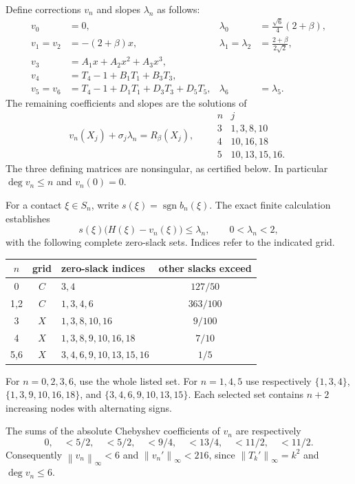 \documentclass[11pt]{article}
\newcommand{\norm}[1]{\left\lVert #1\right\rVert_\infty}
\begin{document}
Define corrections $v_n$ and slopes $\lambda_n$ as follows:
\begin{align*}
 v_0&=0,&\lambda_0&=\tfrac{\sqrt6}{4}(2+\beta),\\
 v_1=v_2&=-(2+\beta)x,&\lambda_1=\lambda_2&=\tfrac{2+\beta}{2\sqrt2},\\
 v_3&=A_1x+A_2x^2+A_3x^3,\\
 v_4&=T_4-1+B_1T_1+B_3T_3,\\
 v_5=v_6&=T_4-1+D_1T_1+D_3T_3+D_5T_5,&\lambda_6&=\lambda_5.
\end{align*}
The remaining coefficients and slopes are the solutions of
\begin{equation}\label{eq:systems}
 v_n(X_j)+\sigma_j\lambda_n=R_\beta(X_j),\qquad
 \begin{array}{c|l}
 n&j\\\hline
 3&1,3,8,10\\
 4&10,16,18\\
 5&10,13,15,16.
 \end{array}
\end{equation}
The three defining matrices are nonsingular, as certified below.
In particular $\deg v_n\le n$ and $v_n(0)=0$.

For a contact $\xi\in S_n$, write $s(\xi)=\operatorname{sgn} b_n(\xi)$.
The exact finite calculation establishes
\begin{equation}\label{eq:finite}
 s(\xi)\bigl(H(\xi)-v_n(\xi)\bigr)\le\lambda_n,
 \qquad 0<\lambda_n<2,
\end{equation}
with the following complete zero-slack sets. Indices refer to the indicated grid.
\begin{center}
\begin{tabular}{cclc}
\toprule
$n$&grid&zero-slack indices&other slacks exceed\\\midrule
0&$C$&$3,4$&$127/50$\\
1,2&$C$&$1,3,4,6$&$363/100$\\
3&$X$&$1,3,8,10,16$&$9/100$\\
4&$X$&$1,3,8,9,10,16,18$&$7/10$\\
5,6&$X$&$3,4,6,9,10,13,15,16$&$1/5$\\\bottomrule
\end{tabular}
\end{center}
For $n=0,2,3,6$, use the whole listed set. For $n=1,4,5$ use respectively
$\{1,3,4\}$, $\{1,3,9,10,16,18\}$, and $\{3,4,6,9,10,13,15\}$.
Each selected set contains $n+2$ increasing nodes with alternating signs.

The sums of the absolute Chebyshev coefficients of $v_n$ are respectively
\[
 0,\quad <5/2,\quad <5/2,\quad <9/4,\quad <13/4,\quad <11/2,\quad <11/2.
\]
Consequently $\norm{v_n}<6$ and $\norm{v_n'}<216$, since
$\norm{T_k'}=k^2$ and $\deg v_n\le6$.
\end{document}
